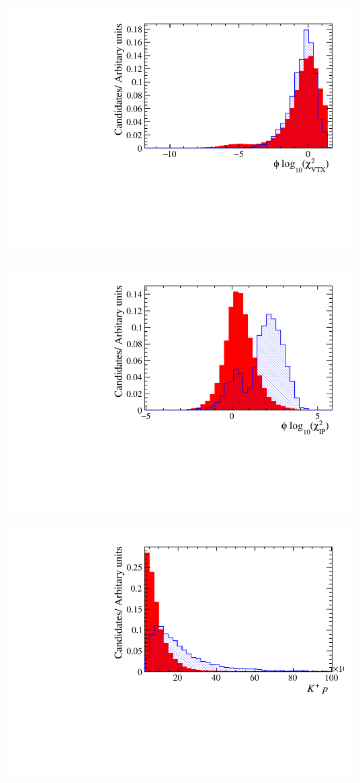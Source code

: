 \begin{figure}[!h]
\begin{subfigure}[t]{0.22\textwidth}
      \includegraphics[width=1.0\textwidth]{figs/Selection/Phi_BDT_Var_Ds2KKPi_log10_Phi_ENDVERTEX_CHI2.pdf}
   \end{subfigure}
   \begin{subfigure}[t]{0.22\textwidth}
      \centering
      \includegraphics[width=1.0\textwidth]{figs/Selection/Phi_BDT_Var_Ds2KKPi_log10_Phi_IPCHI2_OWNPV.pdf}
   \end{subfigure}
   \begin{subfigure}[t]{0.22\textwidth}
      \centering
      \includegraphics[width=1.0\textwidth]{figs/Selection/Phi_BDT_Var_Ds2KKPi_Phi_K0_P.pdf}

\end{subfigure}
\end{figure}
